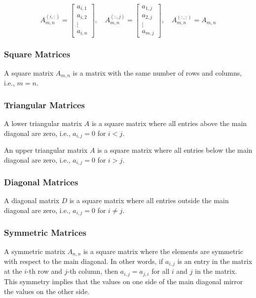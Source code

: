 $$
A_{m,n}^{(i, :)} = \begin{bmatrix}
    a_{i,1}\\
    a_{i, 2}\\
    \vdots\\
    a_{i, n}
\end{bmatrix}, \quad A_{m,n}^{(:, j)} = \begin{bmatrix}
    a_{1,j}\\
    a_{2,j}\\
    \vdots\\
    a_{m,j}
\end{bmatrix}, \quad  A_{m,n}^{(:, :)} = A_{m,n}
$$


\subsubsection{Square Matrices}

A square matrix $A_{m,n}$ is a matrix with the same number of rows and columns, i.e., $m = n$.

\subsubsection{Triangular Matrices}
A lower triangular matrix $A$ is a square matrix where all entries above the main diagonal are zero, i.e., $a_{i,j} = 0$ for $i < j$.

An upper triangular matrix $A$ is a square matrix where all entries below the main diagonal are zero, i.e., $a_{i,j} = 0$ for $i > j$.

\subsubsection{Diagonal Matrices}

A diagonal matrix $D$ is a square matrix where all entries outside the main diagonal are zero, i.e., $a_{i,j} = 0$ for $i \neq j$.

\subsubsection{Symmetric Matrices}
A symmetric matrix $A_{n,n}$ is a square matrix where the elements are symmetric with respect to the main diagonal. In other words, if $a_{i,j}$ is an entry in the matrix at the $i$-th row and $j$-th column, then $a_{i,j} = a_{j,i}$ for all $i$ and $j$ in the matrix. This symmetry implies that the values on one side of the main diagonal mirror the values on the other side.